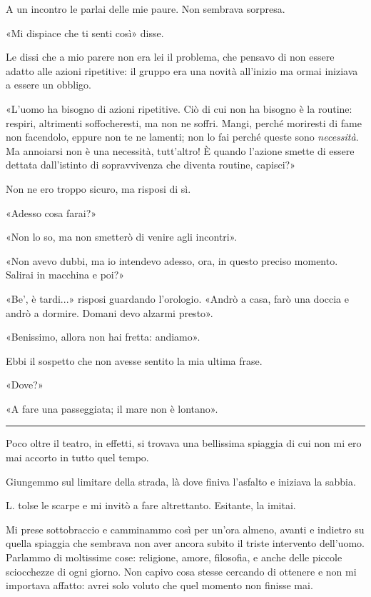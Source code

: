 \documentclass[a4paper,11pt,oneside,openright,final]{memoir}
\begin{document}
A un incontro le parlai delle mie paure. Non sembrava sorpresa.

«Mi dispiace che ti senti così» disse.

Le dissi che a mio parere non era lei il problema, che pensavo di non essere
adatto alle azioni ripetitive: il gruppo era una novità all'inizio ma ormai
iniziava a essere un obbligo.

«L'uomo ha bisogno di azioni ripetitive. Ciò di cui non ha bisogno è la
routine: respiri, altrimenti soffocheresti, ma non ne soffri. Mangi, perché
moriresti di fame non facendolo, eppure non te ne lamenti; non lo fai perché
queste sono \emph{necessità}. Ma annoiarsi non è una necessità, tutt'altro! È
quando l'azione smette di essere dettata dall'istinto di sopravvivenza che
diventa routine, capisci?»

Non ne ero troppo sicuro, ma risposi di sì.

«Adesso cosa farai?»

«Non lo so, ma non smetterò di venire agli incontri».

«Non avevo dubbi, ma io intendevo adesso, ora, in questo preciso momento.
Salirai in macchina e poi?»

«Be', è tardi...»  risposi guardando l'orologio. «Andrò a casa, farò una doccia
e andrò a dormire. Domani devo alzarmi presto».

«Benissimo, allora non hai fretta: andiamo».

Ebbi il sospetto che non avesse sentito la mia ultima frase.

«Dove?»

«A fare una passeggiata; il mare non è lontano».

\plainbreak{1}

Poco oltre il teatro, in effetti, si trovava una bellissima spiaggia di cui non
mi ero mai accorto in tutto quel tempo.

Giungemmo sul limitare della strada, là dove finiva l'asfalto e iniziava la
sabbia.

L. tolse le scarpe e mi invitò a fare altrettanto. Esitante, la imitai.

Mi prese sottobraccio e camminammo così per un'ora almeno, avanti e indietro
su quella spiaggia che sembrava non aver ancora subito il triste intervento
dell'uomo. Parlammo di moltissime cose: religione, amore, filosofia, e anche
delle piccole sciocchezze di ogni giorno. Non capivo cosa stesse cercando di
ottenere e non mi importava affatto: avrei solo voluto che quel momento non
finisse mai.
\end{document}
